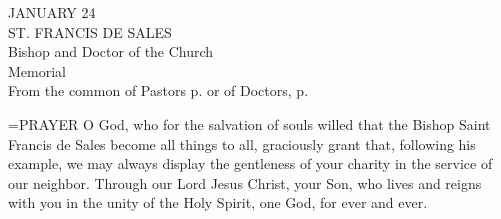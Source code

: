 \begin{center}\normalsize JANUARY 24\\
\footnotesize ST. FRANCIS DE SALES\\
\footnotesize Bishop and Doctor of the Church\\
\footnotesize Memorial\\
\footnotesize From the common of Pastors p.   or of Doctors, p. \\
\end{center}

\hangindent=\parindent \small{PRAYER 
O God, who for the salvation of souls
willed that the Bishop Saint Francis de Sales
become all things to all,
graciously grant that, following his example,
we may always display the gentleness of your charity
in the service of our neighbor.
Through our Lord Jesus Christ, your Son,
who lives and reigns with you in the unity of the Holy Spirit,
one God, for ever and ever.
 \\}
 
